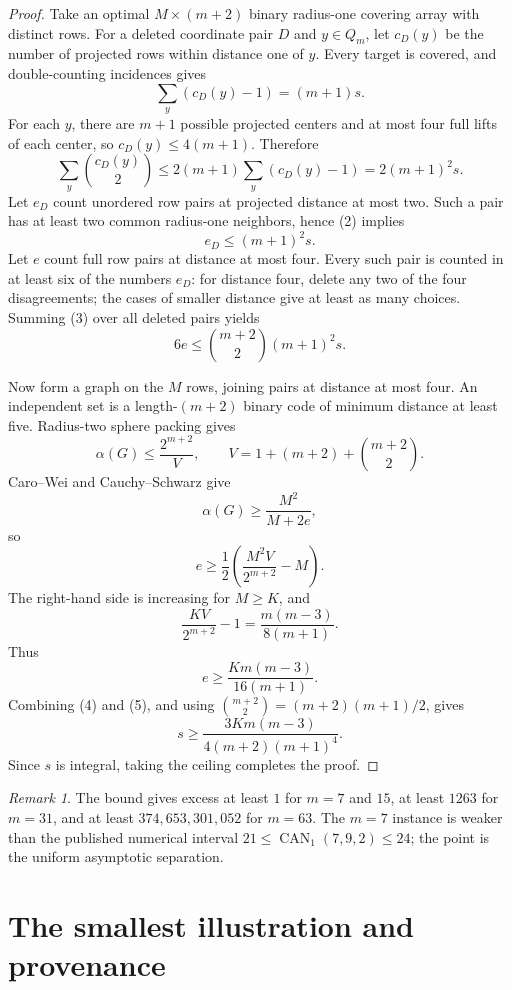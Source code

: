 \documentclass[11pt]{article}
\theoremstyle{definition}
\theoremstyle{remark}
\newtheorem{remark}[theorem]{Remark}
\newcommand{\CAN}{\operatorname{CAN}}
\begin{document}
\begin{proof}
Take an optimal $M\times(m+2)$ binary radius-one covering array with distinct
rows.  For a deleted coordinate pair $D$ and $y\in Q_m$, let $c_D(y)$ be the
number of projected rows within distance one of $y$.  Every target is covered,
and double-counting incidences gives
\[
 \sum_y(c_D(y)-1)=(m+1)s.                                      \tag{1}
\]
For each $y$, there are $m+1$ possible projected centers and at most four full
lifts of each center, so $c_D(y)\le4(m+1)$.  Therefore
\[
 \sum_y {c_D(y)\choose2}
 \le 2(m+1)\sum_y(c_D(y)-1)
 =2(m+1)^2s.                                                    \tag{2}
\]
Let $e_D$ count unordered row pairs at projected distance at most two.  Such a
pair has at least two common radius-one neighbors, hence (2) implies
\[
 e_D\le(m+1)^2s.                                                \tag{3}
\]
Let $e$ count full row pairs at distance at most four.  Every such pair is
counted in at least six of the numbers $e_D$: for distance four, delete any two
of the four disagreements; the cases of smaller distance give at least as many
choices.  Summing (3) over all deleted pairs yields
\[
 6e\le {m+2\choose2}(m+1)^2s.                                  \tag{4}
\]

Now form a graph on the $M$ rows, joining pairs at distance at most four.  An
independent set is a length-$(m+2)$ binary code of minimum distance at least
five.  Radius-two sphere packing gives
\[
 \alpha(G)\le \frac{2^{m+2}}{V},
 \qquad
 V=1+(m+2)+{m+2\choose2}.
\]
Caro--Wei and Cauchy--Schwarz give
\[
 \alpha(G)\ge\frac{M^2}{M+2e},
\]
so
\[
 e\ge\frac12\left(\frac{M^2V}{2^{m+2}}-M\right).
\]
The right-hand side is increasing for $M\ge K$, and
\[
 \frac{KV}{2^{m+2}}-1=\frac{m(m-3)}{8(m+1)}.
\]
Thus
\[
 e\ge\frac{K m(m-3)}{16(m+1)}.                                \tag{5}
\]
Combining (4) and (5), and using
${m+2\choose2}=(m+2)(m+1)/2$, gives
\[
 s\ge\frac{3K m(m-3)}{4(m+2)(m+1)^4}.
\]
Since $s$ is integral, taking the ceiling completes the proof.
\end{proof}

\begin{remark}
The bound gives excess at least $1$ for $m=7$ and $15$, at least $1263$ for
$m=31$, and at least $374{,}653{,}301{,}052$ for $m=63$.  The $m=7$ instance
is weaker than the published numerical interval
$21\le\CAN_1(7,9,2)\le24$; the point is the uniform asymptotic separation.
\end{remark}

\section{The smallest illustration and provenance}
\end{document}
